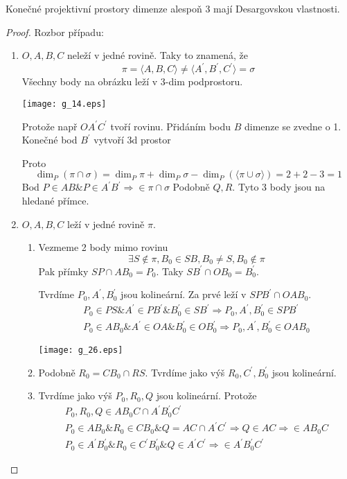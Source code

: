 \begin{theorem}
    Konečné projektivní prostory dimenze alespoň 3 mají Desargovskou vlastnosti.
\end{theorem}
\begin{proof}
	Rozbor případu:
	\begin{enumerate}
		\item $O, A, B, C$ neleží v jedné rovině.
			Taky to znamená, že
			\[ \pi = \langle A, B, C \rangle \ne \langle A^{\prime}, B^{\prime}, C^{\prime} \rangle = \sigma \]
			Všechny body na obrázku leží v 3-dim podprostoru.

    	\texttt{[image: g\_14.eps]}

	Protože např $OA^{\prime}C^{\prime}$ tvoří rovinu.
	Přidáním bodu $B$ dimenze se zvedne o 1.
	Konečné bod $B^{\prime}$ vytvoří 3d prostor

	Proto
	\[ \dim_P(\pi \cap \sigma) = \dim_P \pi + \dim_P \sigma - \dim_P(\langle \pi \cup \sigma \rangle) = 2 + 2 - 3 = 1 \]
	Bod $P \in AB \& P \in A^{\prime}B^{\prime} \Rightarrow \in \pi \cap \sigma$
	Podobně $Q, R$.
	Tyto 3 body jsou na hledané přímce.
		\item $O, A, B, C$ leží v jedné rovině $\pi$.
			\begin{enumerate}
				\item Vezmeme 2 body mimo rovinu
			\[ \exists S \notin \pi, B_0 \in SB, B_0 \ne S, B_0 \notin \pi \]
			Pak přímky $SP \cap AB_0 = P_0$.
			Taky $SB^{\prime} \cap OB_0 = B_0^{\prime}$.

			Tvrdíme $P_0, A^{\prime}, B_0^{\prime}$ jsou kolineární.
			Za prvé leží v $SPB^{\prime} \cap OAB_0$.
			\begin{gather*}
			P_0 \in PS \& A^{\prime} \in PB^{\prime} \& B_0^{\prime} \in SB^{\prime} \Rightarrow P_0, A^{\prime}, B_0^{\prime} \in SPB^{\prime} \\
			P_0 \in AB_0 \& A^{\prime} \in OA \& B_0^{\prime} \in OB_0^{\prime} \Rightarrow P_0, A^{\prime}, B_0^{\prime} \in OAB_0
			\end{gather*}

    	\texttt{[image: g\_26.eps]}

				\item Podobně $R_0 = CB_0 \cap RS$.
			Tvrdíme jako výš $R_0, C^{\prime}, B_0^{\prime}$ jsou kolineární.

			\item Tvrdíme jako výš $P_0, R_0, Q$ jsou kolineární.
			Protože
			\begin{gather*}
			P_0, R_0, Q \in AB_0C \cap A^{\prime}B_0^{\prime}C^{\prime} \\
			P_0 \in AB_0 \& R_0 \in CB_0 \& Q = AC \cap A^{\prime}C^{\prime} \Rightarrow Q \in AC \Rightarrow \in AB_0C \\
			P_0 \in A^{\prime}B_0^{\prime} \& R_0 \in C^{\prime}B_0^{\prime} \& Q \in A^{\prime}C^{\prime} \Rightarrow \in A^{\prime}B_0^{\prime}C^{\prime}
			\end{gather*}


\end{enumerate}
\end{enumerate}
\end{proof}
